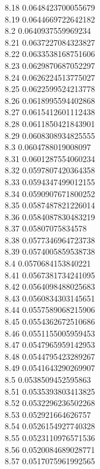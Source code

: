 {8.18	0.0648423700055679\\
8.19	0.0644669722642182\\
8.2	0.0640937559969234\\
8.21	0.0637227084323827\\
8.22	0.0633538168751606\\
8.23	0.0629870687052297\\
8.24	0.0626224513775027\\
8.25	0.0622599524213778\\
8.26	0.0618995594402868\\
8.27	0.0615412601112438\\
8.28	0.0611850421843901\\
8.29	0.0608308934825555\\
8.3	0.0604788019008097\\
8.31	0.0601287554060234\\
8.32	0.0597807420364358\\
8.33	0.0594347499012155\\
8.34	0.0590907671800252\\
8.35	0.0587487821226014\\
8.36	0.0584087830483219\\
8.37	0.05807075834578\\
8.38	0.0577346964723738\\
8.39	0.0574005859538738\\
8.4	0.0570684153840221\\
8.41	0.0567381734241095\\
8.42	0.0564098488025683\\
8.43	0.0560834303145651\\
8.44	0.0557589068215906\\
8.45	0.0554362672510686\\
8.46	0.0551155005959453\\
8.47	0.0547965959142953\\
8.48	0.0544795423289267\\
8.49	0.0541643290269907\\
8.5	0.0538509452595863\\
8.51	0.0535393803413825\\
8.52	0.0532296236502268\\
8.53	0.052921664626757\\
8.54	0.0526154927740328\\
8.55	0.0523110976571536\\
8.56	0.0520084689028771\\
8.57	0.0517075961992565\\
}
